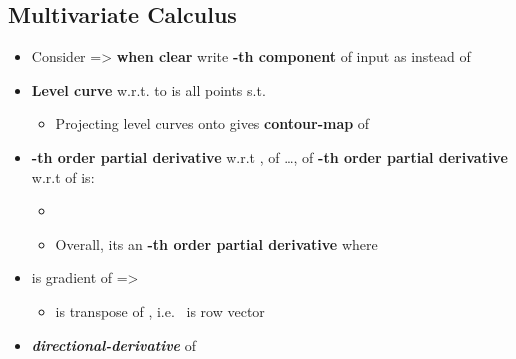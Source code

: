 \subsection*{Multivariate Calculus}

\begin{itemize}

\item
  Consider  =\textgreater{}
  \textbf{when clear} write \textbf{-th component} of input as
   instead of 
\item
  \textbf{Level curve} w.r.t. to  is all points
  s.t. 

  \begin{itemize}
  
  \item
    Projecting level curves onto  gives
    \textbf{contour-map} of 
  \end{itemize}
\item
  \textbf{-th order partial derivative} w.r.t
  , of \ldots, of \textbf{-th order
  partial derivative} w.r.t  of  is:

  \begin{itemize}
  
  \item
  \item
    Overall, its an \textbf{-th order partial derivative} where
  \end{itemize}
\item
  is gradient of  =\textgreater{}

  \begin{itemize}
  
  \item
     is transpose of
    , i.e.~ is row vector
  \end{itemize}
\item
  \textbf{\emph{directional-derivative}} of 


\end{itemize}
